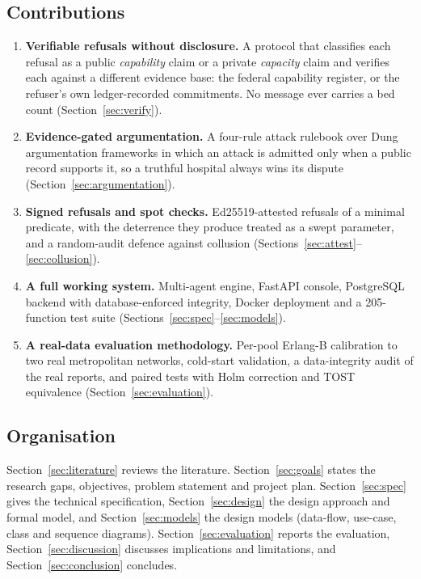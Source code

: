 \subsection{Contributions}
\begin{enumerate}
\setlength{\itemsep}{1pt}
\item \textbf{Verifiable refusals without disclosure.} A protocol that classifies each refusal as a public \emph{capability} claim or a private \emph{capacity} claim and verifies each against a different evidence base: the federal capability register, or the refuser's own ledger-recorded commitments. No message ever carries a bed count (Section~\ref{sec:verify}).
\item \textbf{Evidence-gated argumentation.} A four-rule attack rulebook over Dung argumentation frameworks in which an attack is admitted only when a public record supports it, so a truthful hospital always wins its dispute (Section~\ref{sec:argumentation}).
\item \textbf{Signed refusals and spot checks.} Ed25519-attested refusals of a minimal predicate, with the deterrence they produce treated as a swept parameter, and a random-audit defence against collusion (Sections~\ref{sec:attest}--\ref{sec:collusion}).
\item \textbf{A full working system.} Multi-agent engine, FastAPI console, PostgreSQL backend with database-enforced integrity, Docker deployment and a 205-function test suite (Sections~\ref{sec:spec}--\ref{sec:models}).
\item \textbf{A real-data evaluation methodology.} Per-pool Erlang-B calibration to two real metropolitan networks, cold-start validation, a data-integrity audit of the real reports, and paired tests with Holm correction and TOST equivalence (Section~\ref{sec:evaluation}).
\end{enumerate}

\subsection{Organisation}
Section~\ref{sec:literature} reviews the literature. Section~\ref{sec:goals} states the research gaps, objectives, problem statement and project plan. Section~\ref{sec:spec} gives the technical specification, Section~\ref{sec:design} the design approach and formal model, and Section~\ref{sec:models} the design models (data-flow, use-case, class and sequence diagrams). Section~\ref{sec:evaluation} reports the evaluation, Section~\ref{sec:discussion} discusses implications and limitations, and Section~\ref{sec:conclusion} concludes.
